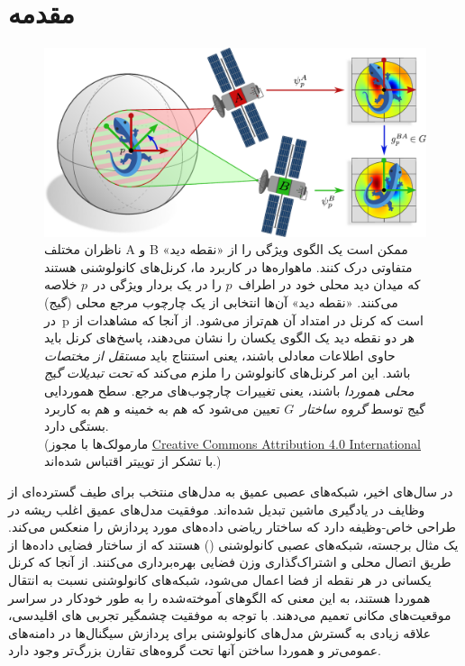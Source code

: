 

\section{مقدمه}


\begin{figure}
	\centering
	\vspace*{-2ex}
	\includegraphics[width=.94\textwidth]{figures/satellite_kernels.pdf}
	\caption{\small
		ناظران مختلف A و B ممکن است یک الگوی ویژگی را از «نقطه دید» متفاوتی درک کنند.
		ماهواره‌ها در کاربرد ما، کرنل‌های کانولوشنی هستند که میدان دید محلی خود در اطراف~$p$ را در یک بردار ویژگی در~$p$ خلاصه می‌کنند.
		«نقطه دید» آن‌ها انتخابی از یک چارچوب مرجع محلی (گیج) در~p است که کرنل در امتداد آن هم‌تراز می‌شود.
		از آنجا که مشاهدات از هر دو نقطه دید یک الگوی یکسان را نشان می‌دهند، پاسخ‌های کرنل باید حاوی اطلاعات معادلی باشند، یعنی استنتاج باید \emph{مستقل از مختصات} باشد.
		این امر کرنل‌های کانولوشن را ملزم می‌کند که \emph{تحت تبدیلات گیج محلی هموردا} باشند، یعنی تغییرات چارچوب‌های مرجع.
		سطح هموردایی گیج توسط \emph{گروه ساختار}~$G$ تعیین می‌شود که هم به خمینه و هم به کاربرد بستگی دارد.
		{ \\
			\color{gray}
			\scriptsize
			(مارمولک‌ها با مجوز \href{https://github.com/twitter/twemoji/blob/gh-pages/LICENSE-GRAPHICS}{\underline{Creative Commons Attribution 4.0 International}} با تشکر از توییتر اقتباس شده‌اند.)
		}
	}
	\label{fig:satellite}
\end{figure}


در سال‌های اخیر، شبکه‌های عصبی عمیق به مدل‌های منتخب برای طیف گسترده‌ای از وظایف در یادگیری ماشین تبدیل شده‌اند.
موفقیت مدل‌های عمیق اغلب ریشه در طراحی خاص-وظیفه دارد که ساختار ریاضی داده‌های مورد پردازش را منعکس می‌کند.
یک مثال برجسته، شبکه‌های عصبی کانولوشنی (\CNN) هستند که از ساختار فضایی داده‌ها از طریق اتصال محلی و اشتراک‌گذاری وزن فضایی بهره‌برداری می‌کنند.
از آنجا که کرنل یکسانی در هر نقطه از فضا اعمال می‌شود، شبکه‌های کانولوشنی نسبت به انتقال هموردا هستند، به این معنی که الگوهای آموخته‌شده را به طور خودکار در سراسر موقعیت‌های مکانی تعمیم می‌دهند.
با توجه به موفقیت چشمگیر تجربی \CNN{}های اقلیدسی، علاقه زیادی به گسترش مدل‌های کانولوشنی برای پردازش سیگنال‌ها در دامنه‌های عمومی‌تر و هموردا ساختن آنها تحت گروه‌های تقارن بزرگ‌تر وجود دارد.


